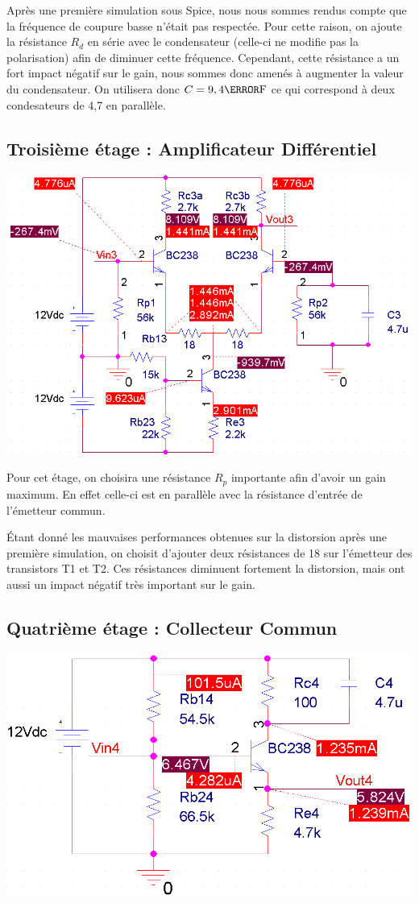 \documentclass[11pt;a4paper]{report}
\begin{document}
    Après une première simulation sous Spice, nous nous sommes rendus compte que la fréquence de coupure basse n'était pas respectée.
    Pour cette raison, on ajoute la résistance $R_d$ en série avec le condensateur (celle-ci ne modifie pas la polarisation) afin de diminuer cette fréquence.
    Cependant, cette résistance a un fort impact négatif sur le gain, nous sommes donc amenés à augmenter la valeur du condensateur. On utilisera donc $C=9,4 \micro\farad$  ce qui correspond à deux condesateurs de 4,7 \micro\farad  en parallèle.

   \subsection{Troisième étage : Amplificateur Différentiel}
    \includegraphics[width=18cm]{images/circuit_3}

    Pour cet étage, on choisira une résistance $R_p$ importante afin d'avoir un gain maximum.
    En effet celle-ci est en parallèle avec la résistance d'entrée de l'émetteur commun.

    Étant donné les mauvaises performances obtenues sur la distorsion après une première simulation, on choisit d'ajouter deux résistances de 18 \ohm  sur l'émetteur des transistors T1 et T2. Ces résistances diminuent fortement la distorsion, mais ont aussi un impact négatif très important sur le gain.

   \subsection{Quatrième étage : Collecteur Commun}
    \includegraphics[width=18cm]{images/circuit_4}
\end{document}

